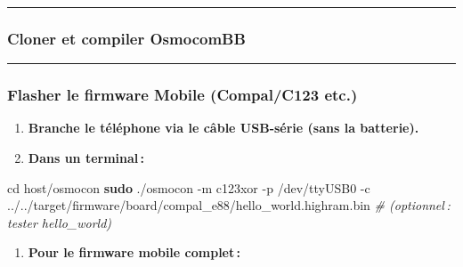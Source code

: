 \documentclass[
]{article}
\newenvironment{Shaded}{\begin{snugshade}}{\end{snugshade}}
\newcommand{\AttributeTok}[1]{\textcolor[rgb]{0.13,0.29,0.53}{#1}}
\newcommand{\BuiltInTok}[1]{#1}
\newcommand{\CommentTok}[1]{\textcolor[rgb]{0.56,0.35,0.01}{\textit{#1}}}
\newcommand{\ExtensionTok}[1]{#1}
\newcommand{\FunctionTok}[1]{\textcolor[rgb]{0.13,0.29,0.53}{\textbf{#1}}}
\newcommand{\NormalTok}[1]{#1}
\newcommand{\OperatorTok}[1]{\textcolor[rgb]{0.81,0.36,0.00}{\textbf{#1}}}
\newcommand{\VariableTok}[1]{\textcolor[rgb]{0.00,0.00,0.00}{#1}}
\providecommand{\tightlist}{%
  \setlength{\itemsep}{0pt}\setlength{\parskip}{0pt}}
\begin{document}
\begin{center}\rule{0.5\linewidth}{0.5pt}\end{center}

\subsubsection{Cloner et compiler
OsmocomBB}\label{cloner-et-compiler-osmocombb}

\begin{Shaded}
\end{Shaded}

\begin{center}\rule{0.5\linewidth}{0.5pt}\end{center}

\subsubsection{Flasher le firmware Mobile (Compal/C123
etc.)}\label{flasher-le-firmware-mobile-compalc123-etc.}

\begin{enumerate}
\def\labelenumi{\arabic{enumi}.}
\item
  \textbf{Branche le téléphone via le câble USB-série (sans la
  batterie).}
\item
  \textbf{Dans un terminal\,:}
\end{enumerate}

\begin{Shaded}
\begin{Highlighting}[]
\BuiltInTok{cd}\NormalTok{ host/osmocon}
\FunctionTok{sudo}\NormalTok{ ./osmocon }\AttributeTok{{-}m}\NormalTok{ c123xor }\AttributeTok{{-}p}\NormalTok{ /dev/ttyUSB0 }\AttributeTok{{-}c}\NormalTok{ ../../target/firmware/board/compal\_e88/hello\_world.highram.bin}
\CommentTok{\# (optionnel : tester hello\_world)}
\end{Highlighting}
\end{Shaded}

\begin{enumerate}
\def\labelenumi{\arabic{enumi}.}
\setcounter{enumi}{2}
\tightlist
\item
  \textbf{Pour le firmware mobile complet\,:}
\end{enumerate}
\end{document}
